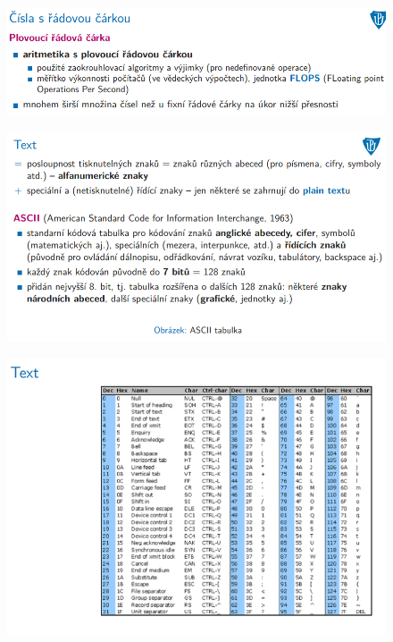 \documentclass[10pt,a4paper]{article}
\begin{document}
\begin{figure} [h]
	\includegraphics[scale=0.65]{img/prvni_odstavec/otazka3/cisla_s_radovou_carkou8.png}	
\end{figure}

\begin{figure} [h]
	\includegraphics[scale=0.65]{img/prvni_odstavec/otazka3/text1.png}	
\end{figure}

\begin{figure} [h]
	\includegraphics[scale=0.65]{img/prvni_odstavec/otazka3/text2.png}	
\end{figure}
\end{document}
